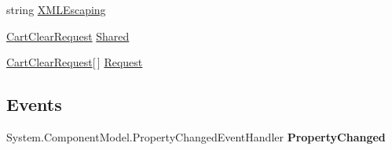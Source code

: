 \begin{DoxyCompactItemize}
\begin{DoxyCompactList}\small\item\em \end{DoxyCompactList}\item 
\hypertarget{class_amazon___price___finder_1_1amazon_1_1ecs_1_1_cart_clear_a7c2448932e1ac1de6c917b7fd0ce2f2f}{string \hyperlink{class_amazon___price___finder_1_1amazon_1_1ecs_1_1_cart_clear_a7c2448932e1ac1de6c917b7fd0ce2f2f}{X\-M\-L\-Escaping}}\label{class_amazon___price___finder_1_1amazon_1_1ecs_1_1_cart_clear_a7c2448932e1ac1de6c917b7fd0ce2f2f}

\begin{DoxyCompactList}\small\item\em \end{DoxyCompactList}\item 
\hypertarget{class_amazon___price___finder_1_1amazon_1_1ecs_1_1_cart_clear_a7b9588f95a65ebfb838e8e39f582a985}{\hyperlink{class_amazon___price___finder_1_1amazon_1_1ecs_1_1_cart_clear_request}{Cart\-Clear\-Request} \hyperlink{class_amazon___price___finder_1_1amazon_1_1ecs_1_1_cart_clear_a7b9588f95a65ebfb838e8e39f582a985}{Shared}}\label{class_amazon___price___finder_1_1amazon_1_1ecs_1_1_cart_clear_a7b9588f95a65ebfb838e8e39f582a985}

\begin{DoxyCompactList}\small\item\em \end{DoxyCompactList}\item 
\hypertarget{class_amazon___price___finder_1_1amazon_1_1ecs_1_1_cart_clear_a84e68d811ec67f68eb9517150d51341e}{\hyperlink{class_amazon___price___finder_1_1amazon_1_1ecs_1_1_cart_clear_request}{Cart\-Clear\-Request}\mbox{[}$\,$\mbox{]} \hyperlink{class_amazon___price___finder_1_1amazon_1_1ecs_1_1_cart_clear_a84e68d811ec67f68eb9517150d51341e}{Request}}\label{class_amazon___price___finder_1_1amazon_1_1ecs_1_1_cart_clear_a84e68d811ec67f68eb9517150d51341e}

\begin{DoxyCompactList}\small\item\em \end{DoxyCompactList}\end{DoxyCompactItemize}
\subsection*{Events}
\begin{DoxyCompactItemize}
\item 
\hypertarget{class_amazon___price___finder_1_1amazon_1_1ecs_1_1_cart_clear_a173e86a08475b10e1ad1d638c5d9241a}{System.\-Component\-Model.\-Property\-Changed\-Event\-Handler {\bfseries Property\-Changed}}\label{class_amazon___price___finder_1_1amazon_1_1ecs_1_1_cart_clear_a173e86a08475b10e1ad1d638c5d9241a}

\end{DoxyCompactItemize}


